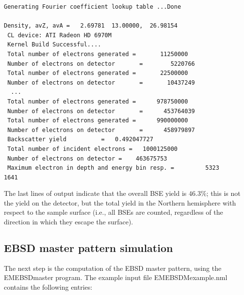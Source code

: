 \documentclass[DIV=calc, paper=letter, fontsize=11pt]{scrartcl}	 %
\begin{document}
\begin{verbatim}
Generating Fourier coefficient lookup table ...Done

Density, avZ, avA =   2.69781  13.00000,  26.98154
 CL device: ATI Radeon HD 6970M                                                                                 
 Kernel Build Successful....
 Total number of electrons generated =       11250000
 Number of electrons on detector       =        5220766
 Total number of electrons generated =       22500000
 Number of electrons on detector       =       10437249
  ...
 Total number of electrons generated =      978750000
 Number of electrons on detector       =      453764039
 Total number of electrons generated =      990000000
 Number of electrons on detector       =      458979897
 Backscatter yield          =   0.492047727    
 Total number of incident electrons =   1000125000
 Number of electrons on detector =    463675753
 Maximum electron in depth and energy bin resp. =         5323        1641
\end{verbatim}
The last lines of output indicate that the overall BSE yield is $46.3\%$; this is not the 
yield on the detector, but the total yield in the Northern hemisphere with respect to the 
sample surface (i.e., all BSEs are counted, regardless of the direction in which they
escape the surface).

\subsection{EBSD master pattern simulation}
The next step is the computation of the EBSD master pattern, using the \textsf{EMEBSDmaster} program. 
The example input file \textsf{EMEBSDMexample.nml} contains the following entries:
\end{document}
